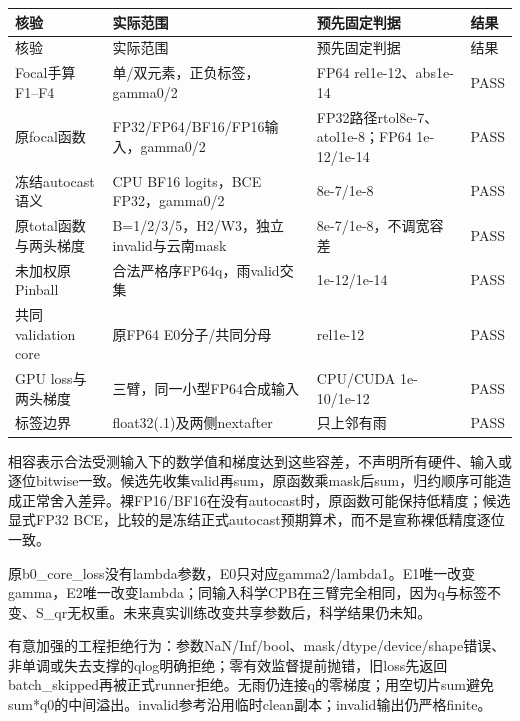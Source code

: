 \documentclass[UTF8,fontset=fandol,10pt]{ctexart}
\begin{document}
\begingroup\small\setlength{\tabcolsep}{3pt}\renewcommand{\arraystretch}{1.12}
\begin{longtable}{>{\raggedright\arraybackslash}p{\dimexpr(\linewidth-8\tabcolsep)/4\relax}>{\raggedright\arraybackslash}p{\dimexpr(\linewidth-8\tabcolsep)/4\relax}>{\raggedright\arraybackslash}p{\dimexpr(\linewidth-8\tabcolsep)/4\relax}>{\raggedright\arraybackslash}p{\dimexpr(\linewidth-8\tabcolsep)/4\relax}}
\toprule
核验 & 实际范围 & 预先固定判据 & 结果 \\
\midrule\endfirsthead
核验 & 实际范围 & 预先固定判据 & 结果 \\
\midrule\endhead
Focal手算F1–F4 & 单/\allowbreak{}双元素，正负标签，gamma0/\allowbreak{}2 & FP64 rel1e-12、abs1e-14 & PASS \\
原focal函数 & FP32/\allowbreak{}FP64/\allowbreak{}BF16/\allowbreak{}FP16输入，gamma0/\allowbreak{}2 & FP32路径rtol8e-7、atol1e-8；FP64 1e-12/\allowbreak{}1e-14 & PASS \\
冻结autocast语义 & CPU BF16 logits，BCE FP32，gamma0/\allowbreak{}2 & 8e-7/\allowbreak{}1e-8 & PASS \\
原total函数与两头梯度 & B=1/\allowbreak{}2/\allowbreak{}3/\allowbreak{}5，H2/\allowbreak{}W3，独立invalid与云南mask & 8e-7/\allowbreak{}1e-8，不调宽容差 & PASS \\
未加权原Pinball & 合法严格序FP64q，雨valid交集 & 1e-12/\allowbreak{}1e-14 & PASS \\
共同validation core & 原FP64 E0分子/\allowbreak{}共同分母 & rel1e-12 & PASS \\
GPU loss与两头梯度 & 三臂，同一小型FP64合成输入 & CPU/\allowbreak{}CUDA 1e-10/\allowbreak{}1e-12 & PASS \\
标签边界 & float32(.1)及两侧nextafter & 只上邻有雨 & PASS \\
\bottomrule\end{longtable}\endgroup

相容表示合法受测输入下的数学值和梯度达到这些容差，不声明所有硬件、输入或逐位bitwise一致。候选先收集valid再sum，原函数乘mask后sum，归约顺序可能造成正常舍入差异。裸FP16/\allowbreak{}BF16在没有autocast时，原函数可能保持低精度；候选显式FP32 BCE，比较的是冻结正式autocast预期算术，而不是宣称裸低精度逐位一致。

原b0\_\allowbreak{}core\_\allowbreak{}loss没有lambda参数，E0只对应gamma2/\allowbreak{}lambda1。E1唯一改变gamma，E2唯一改变lambda；同输入科学CPB在三臂完全相同，因为q与标签不变、S\_\allowbreak{}qr无权重。未来真实训练改变共享参数后，科学结果仍未知。

有意加强的工程拒绝行为：参数NaN/\allowbreak{}Inf/\allowbreak{}bool、mask/\allowbreak{}dtype/\allowbreak{}device/\allowbreak{}shape错误、非单调或失去支撑的qlog明确拒绝；零有效监督提前抛错，旧loss先返回batch\_\allowbreak{}skipped再被正式runner拒绝。无雨仍连接q的零梯度；用空切片sum避免sum*q0的中间溢出。invalid参考沿用临时clean副本；invalid输出仍严格finite。
\end{document}
